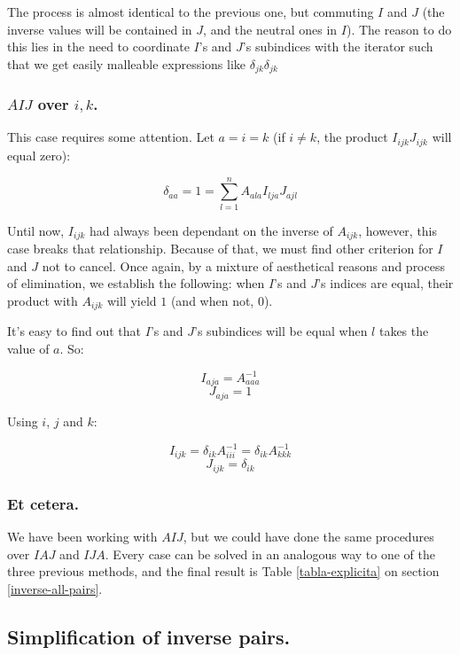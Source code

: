 The process is almost identical to the previous one, but commuting $I$ and $J$ (the inverse values will be contained in $J$, and the neutral ones in $I$). The reason to do this lies in the need to coordinate $I$'s and $J$'s subindices with the iterator such that we get easily malleable expressions like $\delta_{jk} \delta_{jk}$

\newpage

\subsubsection{$AIJ$ over $i, k$.}

This case requires some attention. Let $a = i = k$ (if $i \neq k$, the product $I_{ijk} J_{ijk}$ will equal zero):

$$\delta_{aa} = 1 = \sum\limits_{l = 1}^{n} A_{ala} I_{lja} J_{ajl}$$

Until now, $I_{ijk}$ had always been dependant on the inverse of $A_{ijk}$, however, this case breaks that relationship. Because of that, we must find other criterion for $I$ and $J$ not to cancel. Once again, by a mixture of aesthetical reasons and process of elimination, we establish the following: when $I$'s and $J$'s indices are equal, their product with $A_{ijk}$ will yield $1$ (and when not, $0$).

It's easy to find out that $I$'s and $J$'s subindices will be equal when $l$ takes the value of $a$. So:

$$I_{aja} = A_{aaa}^{-1}$$
$$J_{aja} = 1$$

Using $i$, $j$ and $k$:

$$I_{ijk} = \delta_{ik} A_{iii}^{-1} = \delta_{ik} A_{kkk}^{-1}$$
$$J_{ijk} = \delta_{ik}$$

\subsubsection{Et cetera.}

We have been working with $AIJ$, but we could have done the same procedures over $IAJ$ and $IJA$. Every case can be solved in an analogous way to one of the three previous methods, and the final result is Table \ref{tabla-explicita} on section \ref{inverse-all-pairs}.

\subsection{Simplification of inverse pairs.} \label{appendix-4}

